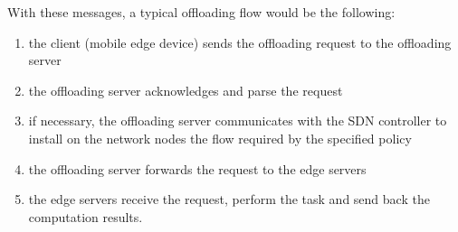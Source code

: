 \documentclass[12pt, a4paper]{article}
\begin{document}
With these messages, a typical offloading flow would be the following:
\begin{enumerate}
\item the client (mobile edge device) sends the offloading request to the offloading server
\item the offloading server acknowledges and parse the request
\item if necessary, the offloading server communicates with the SDN controller to install on the network nodes the flow required by the specified policy
\item the offloading server forwards the request to the edge servers
\item the edge servers receive the request, perform the task and send back the computation results.

\end{enumerate}

\end{document}

